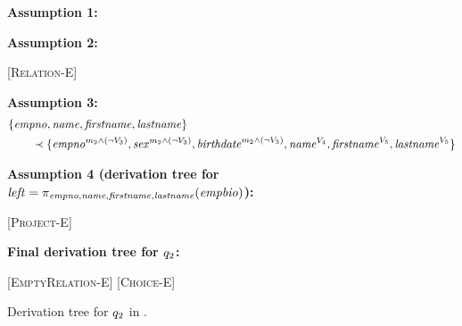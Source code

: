 \begin{figure}
\caption[Example of derivation tree to determine the type of a query]{Derivation tree for \ensuremath{\vQ_2} in .}

\scriptsize
\textbf{Assumption 1:}
\begin{prooftree*}
\end{prooftree*}

\medskip
\textbf{Assumption 2:}
\begin{prooftree*}
 [\textsc{Relation-E}] {\env [\fModel_2 \wedge (\neg \vThree)] [\vSch_2] {\empbio} {\annot [\fModel_2 \wedge (\vFour \vee \vFive)] {(\empno, \sex, \birthdate, \annot [\vFour] \name, \annot [\vFive] \fname, \annot [\vFive] \lname)}}}
\end{prooftree*}

\medskip
\textbf{Assumption 3:}
\begin{alignat*}{1}
& { \{ \empno, \name, \fname, \lname  \} } \\
&\qquad \prec {\{\annot [\fModel_2 \wedge (\neg \vThree)] \empno, \annot [\fModel_2 \wedge (\neg \vThree)] \sex, \annot [\fModel_2 \wedge (\neg \vThree)] \birthdate, \annot [\vFour] \name, \annot [\vFive] \fname, \annot [\vFive] \lname\} } 
\end{alignat*}

\medskip
\textbf{Assumption 4 (derivation tree for $\mathit{left} = {\pi_{\empno, \name, \fname, \lname} (\empbio)}$):}
\begin{prooftree*}
 [\textsc{Project-E}] { {\annot [\fModel_2 \wedge (\neg \vThree)] {(\annot [\fModel_2 \wedge (\neg \vThree)] \empno, \annot [\vFour] \name, \annot [\vFive] \fname, \annot [\vFour] \lname)}}}
\end{prooftree*}

\medskip
\textbf{Final derivation tree for $\vQ_2$:}
\begin{prooftree*}
 [\textsc{EmptyRelation-E}] {\env [\fModel_2 \wedge \neg (\neg \vThree)] [\vSch_2] {\empRel} {}}
 [\textsc{Choice-E}] { {}}
\end{prooftree*}



\end{figure}
